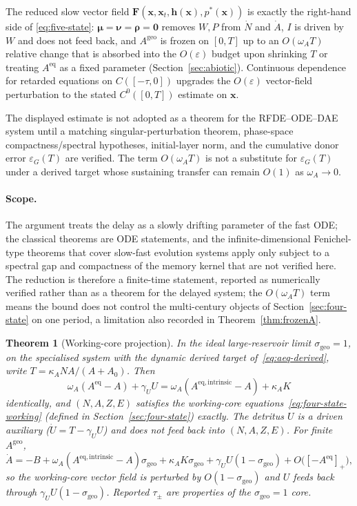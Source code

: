 \documentclass[11pt]{article}
\newtheorem{theorem}{Theorem}
\theoremstyle{definition}
\begin{document}
The reduced slow vector field $\mathbf F(\mathbf x,\mathbf x_t,\mathbf h(\mathbf x),p^*(\mathbf x))$ is exactly the right-hand side of \eqref{eq:five-state}: $\boldsymbol\mu=\boldsymbol\nu=\boldsymbol\rho=\mathbf 0$ removes $W,P$ from $\dot N$ and $\dot A$, $I$ is driven by $W$ and does not feed back, and $A^{\mathrm{geo}}$ is frozen on $[0,T]$ up to an $O(\omega_A T)$ relative change that is absorbed into the $O(\varepsilon)$ budget upon shrinking $T$ or treating $A^{\mathrm{eq}}$ as a fixed parameter (Section~\ref{sec:abiotic}). Continuous dependence for retarded equations on $C([-\tau,0])$ \cite{hale1993} upgrades the $O(\varepsilon)$ vector-field perturbation to the stated $C^0([0,T])$ estimate on $\mathbf x$.


The displayed estimate is not adopted as a theorem for the RFDE--ODE--DAE system until a matching singular-perturbation theorem, phase-space compactness/spectral hypotheses, initial-layer norm, and the cumulative donor error $\varepsilon_G(T)$ are verified. The term $O(\omega_A T)$ is not a substitute for $\varepsilon_G(T)$ under a derived target whose sustaining transfer can remain $O(1)$ as $\omega_A\to0$.

\paragraph{Scope.} The argument treats the delay as a slowly drifting parameter of the fast ODE; the classical theorems \cite{tikhonov1952,fenichel1971,fenichel1979} are ODE statements, and the infinite-dimensional Fenichel-type theorems that cover slow-fast evolution systems \cite{hummelkuehn2022,kuehnsulzbach2024} apply only subject to a spectral gap and compactness of the memory kernel that are not verified here. The reduction is therefore a finite-time statement, reported as numerically verified rather than as a theorem for the delayed system; the $O(\omega_A T)$ term means the bound does not control the multi-century objects of Section~\ref{sec:four-state} on one period, a limitation also recorded in Theorem~\ref{thm:frozenA}.

\begin{theorem}[Working-core projection]
\label{thm:working-proj}
In the ideal large-reservoir limit $\sigma_{\mathrm{geo}}=1$, on the specialised system with the dynamic derived target of~\eqref{eq:aeq-derived}, write $T=\kappa_A N A/(A+A_0)$. Then
\[
\omega_A(A^{\mathrm{eq}}-A)+\gamma_U U=\omega_A(A^{\mathrm{eq,intrinsic}}-A)+\kappa_A K
\]
identically, and $(N,A,Z,E)$ satisfies the working-core equations~\eqref{eq:four-state-working} (defined in Section~\ref{sec:four-state}) exactly. The detritus $U$ is a driven auxiliary ($\dot U=T-\gamma_U U$) and does not feed back into $(N,A,Z,E)$. For finite $A^{\mathrm{geo}}$,
\[
\dot A=-B+\omega_A(A^{\mathrm{eq,intrinsic}}-A)\sigma_{\mathrm{geo}}+\kappa_A K\sigma_{\mathrm{geo}}+\gamma_U U(1-\sigma_{\mathrm{geo}})+O\bigl([{-A^{\mathrm{eq}}}]_+\bigr),
\]
so the working-core vector field is perturbed by $O(1-\sigma_{\mathrm{geo}})$ and $U$ feeds back through $\gamma_U U(1-\sigma_{\mathrm{geo}})$. Reported $\tau_\pm$ are properties of the $\sigma_{\mathrm{geo}}=1$ core.
\end{theorem}
\end{document}
